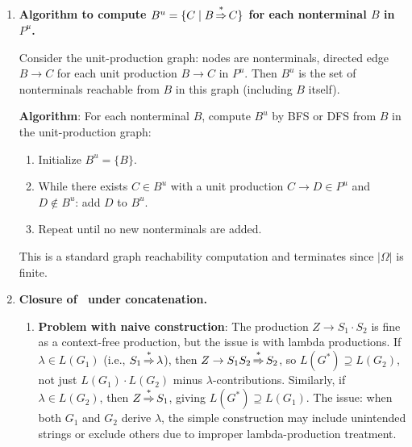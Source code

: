 \begin{enumerate}[{9.}1. ]
\textbf{Lemma}: For each nonterminal $A$ and string $x$, the number of parse trees for $x$ derivable from $A$ is the same in $G$ as in the constructed unambiguous grammar $G'$.

\textbf{Proof}: By induction on $|x|$. Base case $|x|=0$: $A \DRightarrow \lambda$ iff $A \in N_\lambda$ (nullable nonterminals), and the construction handles this uniquely. Inductive step: use the structure of the production applied at the root of the parse tree. \qed

\item \textbf{Algorithm to compute $B^u = \{C \mid B \operatorname{\overset{*}{\Rightarrow}} C\}$ for each nonterminal $B$ in $P^u$.}

Consider the unit-production graph: nodes are nonterminals, directed edge $B \to C$ for each unit production $B \to C$ in $P^u$. Then $B^u$ is the set of nonterminals reachable from $B$ in this graph (including $B$ itself).

\textbf{Algorithm}: For each nonterminal $B$, compute $B^u$ by BFS or DFS from $B$ in the unit-production graph:
\begin{enumerate}
\item Initialize $B^u = \{B\}$.
\item While there exists $C \in B^u$ with a unit production $C \to D \in P^u$ and $D \notin B^u$: add $D$ to $B^u$.
\item Repeat until no new nonterminals are added.
\end{enumerate}
This is a standard graph reachability computation and terminates since $|\Omega|$ is finite.

\item \textbf{Closure of \CSIG\ under concatenation.}

\begin{enumerate}
\item \textbf{Problem with naive construction}: The production $Z \to S_1 \cdot S_2$ is fine as a context-free production, but the issue is with lambda productions. If $\lambda \in L(G_1)$ (i.e., $S_1 \operatorname{\overset{*}{\Rightarrow}} \lambda$), then $Z \to S_1 S_2 \operatorname{\overset{*}{\Rightarrow}} S_2$, so $L(G^*) \supseteq L(G_2)$, not just $L(G_1)\cdot L(G_2)$ minus $\lambda$-contributions. Similarly, if $\lambda \in L(G_2)$, then $Z \operatorname{\overset{*}{\Rightarrow}} S_1$, giving $L(G^*) \supseteq L(G_1)$. The issue: when both $G_1$ and $G_2$ derive $\lambda$, the simple construction may include unintended strings or exclude others due to improper lambda-production treatment.


\end{enumerate}
\end{enumerate}
